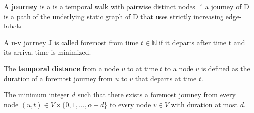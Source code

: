 \documentclass[12pt,a4paper]{article}
\begin{document}
\begin{tcolorbox}[title=Definition: Journey]
  A \textbf{journey} is a is a temporal walk with pairwise distinct nodes \^{=} a journey of D is a path of the underlying static graph of D that uses
strictly increasing edge-labels.
\end{tcolorbox}

\begin{tcolorbox}[title=Definition: Foremost Journey]
  A u-v journey J is called foremost from time $t \in \mathbb{N}$ if it departs after time t and its arrival time is minimized.
\end{tcolorbox}

\begin{tcolorbox}[title=Definition: Temporal distance]
  The \textbf{temporal distance} from a node $u$ to at time $t$ to a node $v$ is defined as the duration of a foremost journey from $u$ to $v$ that departs at time $t$.
\end{tcolorbox}
\begin{tcolorbox}[title=Definition: Temporal diameter $d$]
  The minimum integer $d$ such that there exists a foremost journey from every node $(u, t) \in V \times \{ 0, 1, ..., \alpha - d \}$  to every node $v \in V$ with duration at most $d$.
\end{tcolorbox}

\end{document}
